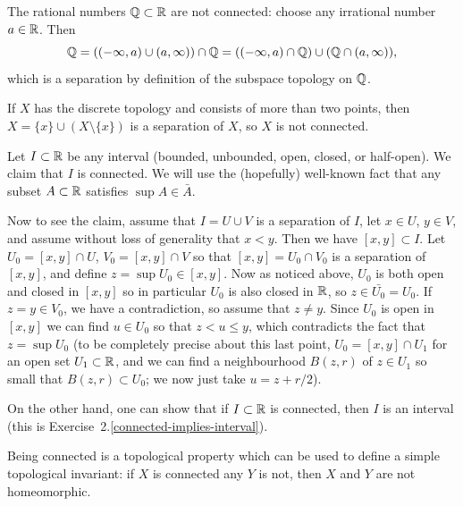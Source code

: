 \begin{example}
  The rational numbers $\mathbb{Q} \subset \mathbb{R}$ are not connected: choose any irrational number $a \in \mathbb{R}$. Then
  \[
    \mathbb{Q} = ((-\infty, a) \cup (a,\infty)) \cap \mathbb{Q} = ((-\infty,a) \cap \mathbb{Q}) \cup (\mathbb{Q} \cap (a,\infty)),
  \]
  which is a separation by definition of the subspace topology on $\mathbb{Q}$.
\end{example}
\begin{example}
  \label{discrete-connectedness}
  If $X$ has the discrete topology and consists of more than two points, then $X = \{x\} \cup (X \setminus \{x\})$ is a separation of $X$, so $X$ is not connected.
\end{example}
\begin{example}
  \label{intervals-are-connected}
  Let $I \subset \mathbb{R}$ be any interval (bounded, unbounded, open, closed, or half-open). We claim that $I$ is connected. We will use the (hopefully) well-known fact that any subset $A \subset \mathbb{R}$ satisfies $\sup A \in \bar A$.
  
  Now to see the claim, assume that $I = U \cup V$ is a separation of $I$, let $x \in U$, $y \in V$, and assume without loss of generality that $x < y$. Then we have $[x,y] \subset I$. Let $U_0 = [x,y] \cap U$, $V_0 = [x,y] \cap V$ so that $[x,y] = U_0 \cap V_0$ is a separation of $[x,y]$, and define $z = \sup U_0 \in [x,y]$. Now as noticed above, $U_0$ is both open and closed in $[x,y]$ so in particular $U_0$ is also closed in $\mathbb{R}$, so $z \in \bar{U_0} = U_0$. If $z = y \in V_0$, we have a contradiction, so assume that $z \not= y$. Since $U_0$ is open in $[x,y]$ we can find $u \in U_0$ so that $z < u \leq y$, which contradicts the fact that $z = \sup U_0$ (to be completely precise about this last point, $U_0 = [x,y] \cap U_1$ for an open set $U_1 \subset \mathbb{R}$, and we can find a neighbourhood $B(z,r)$ of $z \in U_1$ so small that $B(z,r) \subset U_0$; we now just take $u = z+r/2$).
  
  On the other hand, one can show that if $I \subset \mathbb{R}$ is connected, then $I$ is an interval (this is Exercise~2.\ref{connected-implies-interval}).
\end{example}
\begin{rem}
  Being connected is a topological property which can be used to define a simple topological invariant: if $X$ is connected any $Y$ is not, then $X$ and $Y$ are not homeomorphic.
\end{rem}
